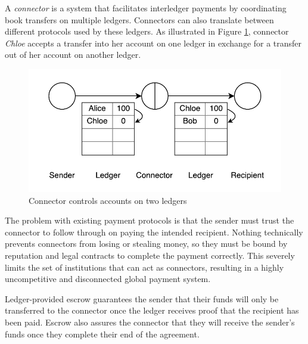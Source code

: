 \documentclass[letterpaper,twocolumn,10pt]{article}
\begin{document}

A \textit{connector} is a system that facilitates interledger payments by coordinating book transfers on multiple ledgers. Connectors can also translate between different protocols used by these ledgers. As illustrated in Figure \ref{fig:connector}, connector \textit{Chloe} accepts a transfer into her account on one ledger in exchange for a transfer out of her account on another ledger. 

\begin{figure}[ht]
    \centering
    \includegraphics[width=\columnwidth]{figures/connector.pdf}
    \caption{Connector controls accounts on two ledgers}
    \label{fig:connector}
\end{figure}

The problem with existing payment protocols is that the sender must trust the connector to follow through on paying the intended recipient. Nothing technically prevents connectors from losing or stealing money, so they must be bound by reputation and legal contracts to complete the payment correctly. This severely limits the set of institutions that can act as connectors, resulting in a highly uncompetitive and disconnected global payment system.

Ledger-provided escrow guarantees the sender that their funds will only be transferred to the connector once the ledger receives proof that the recipient has been paid. Escrow also assures the connector that they will receive the sender's funds once they complete their end of the agreement.
\end{document}
